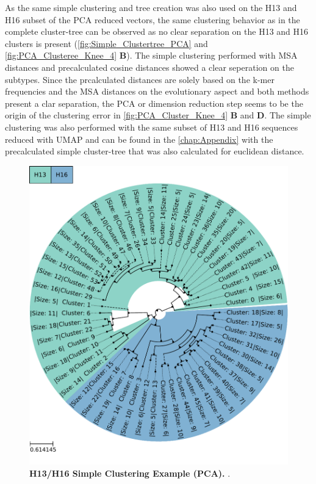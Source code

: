 As the same simple clustering and tree creation was also used on the H13 and H16 subset of the \gls{PCA} reduced vectors, the same clustering behavior as in the complete cluster-tree can be observed as no clear separation on the H13 and H16 clusters is present (\autoref{fig:Simple_Clustertree_PCA} and \autoref{fig:PCA_Clusteree_Knee_4} \textbf{\textsf{B}}). The simple clustering performed with \gls{MSA} distances and precalculated cosine distances showed a clear seperation on the subtypes. Since the prcalculated distances are solely based on the k-mer frequencies and the \gls{MSA} distances on the evolutionary aspect and both methods present a clar separation, the \gls{PCA} or dimension reduction step seems to be the origin of the clustering error in \autoref{fig:PCA_Cluster_Knee_4} \textbf{\textsf{B}} and \textbf{\textsf{D}}. The simple clustering was also performed with the same subset of H13 and H16 sequences reduced with \gls{UMAP} and can be found in the \autoref{chap:Appendix} with the precalculated simple cluster-tree that was also calculated for euclidean distance.

\begin{figure}[!hbt]
    \centering
    \includegraphics[width=\textwidth]{PCA/Clustertree_Segment_4_H_Simple.pdf}
    \caption[H13/H16 Simple Clustering Example (\Acrshort{PCA})]{\textbf{H13/H16 Simple Clustering Example (\Acrshort{PCA}).} .}
    \label{fig:Simple_Clustertree_PCA}
\end{figure}